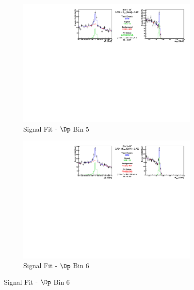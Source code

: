\begin{figure}[h]

\begin{subfigure}[c]{0.99\textwidth}
\includegraphics[width=\textwidth]{figures/plots/fit_results/Dp_bin_04.pdf}
\caption*{Signal Fit - $\Dp$ Bin 5}
\end{subfigure}

\vspace{5pt}

\begin{subfigure}[c]{0.99\textwidth}
\includegraphics[width=\textwidth]{figures/plots/fit_results/Dp_bin_05.pdf}
\caption*{Signal Fit - $\Dp$ Bin 6}
\end{subfigure}

\vspace{5pt}


\end{figure}
